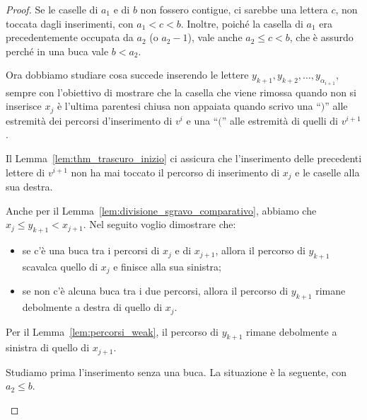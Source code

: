 \begin{proof}
    Se le caselle di $a_1$ e di $b$ non fossero contigue,
    ci sarebbe una lettera $c$, non toccata dagli inserimenti, con $a_1 < c < b$.
    Inoltre, poich\'e la casella di $a_1$ era precedentemente occupata da $a_2$
    (o $a_2-1$), vale anche $a_2 \leq c < b$, che \`e assurdo perch\'e
    in una buca vale $b < a_2$.

    Ora dobbiamo studiare cosa succede inserendo le lettere 
    $y_{k+1}, y_{k+2}, \dots, y_{\alpha_{i+1}}$, sempre con l'obiettivo di mostrare
    che la casella che viene rimossa quando non si inserisce $x_j$ \`e l'ultima
    parentesi chiusa non appaiata quando scrivo una ``$)$'' alle estremit\`a dei
    percorsi d'inserimento di $v^i$ e una ``$\lparen$'' alle estremit\`a di quelli
    di $v^{i+1}$.

    Il Lemma~\ref{lem:thm_trascuro_inizio} ci assicura che l'inserimento delle precedenti
    lettere di $v^{i+1}$ non ha mai toccato il percorso di inserimento di $x_j$ e
    le caselle alla sua destra.

    Anche per il Lemma~\ref{lem:divisione_sgravo_comparativo}, abbiamo che 
    $x_j \leq y_{k+1} < x_{j+1}$.
    Nel seguito voglio dimostrare che:
    \begin{itemize}
        \item se c'\`e una buca tra i percorsi di $x_j$ e di $x_{j+1}$, allora il percorso
            di $y_{k+1}$ scavalca quello di $x_j$ e finisce alla sua sinistra;
        \item se non c'\`e alcuna buca tra i due percorsi, allora il percorso di
            $y_{k+1}$ rimane 
            debolmente
            a destra di quello di $x_j$.
    \end{itemize}

    Per il Lemma~\ref{lem:percorsi_weak}, il percorso di $y_{k+1}$ rimane debolmente
    a sinistra di quello di $x_{j+1}$.

    Studiamo prima l'inserimento senza una buca. La situazione \`e la seguente, con
    $a_2 \leq b$.
    \begin{center}
\end{center}
\end{proof}
